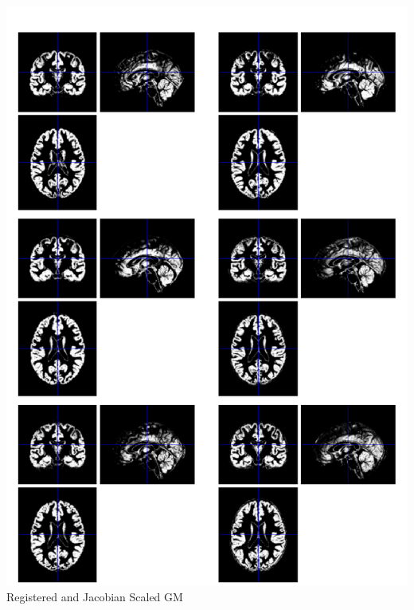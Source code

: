 \documentclass{beamer}
\begin{document}
\begin{frame}
\begin{columns}[c]
\includegraphics[width=1\textwidth]{wc1_ixi}
Registered and Jacobian Scaled GM


\end{columns}
\end{frame}
\end{document}
